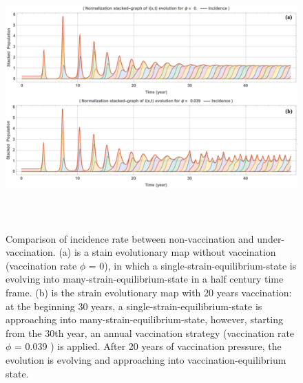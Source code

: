 \documentclass[preprint,12pt]{elsarticle}
\begin{document}
\begin{figure}
  \centering
  \includegraphics[width=6in,height=4in]{figures/UnderVaccination}
  \caption{Comparison of incidence rate between non-vaccination and under-vaccination.
  (a) is a stain evolutionary map without vaccination (vaccination rate \(\phi\) = 0), in which a single-strain-equilibrium-state is evolving into many-strain-equilibrium-state in a half century time frame. 
  (b) is the strain evolutionary map with 20 years vaccination: at the beginning 30 years, a single-strain-equilibrium-state is approaching into many-strain-equilibrium-state, however, starting from the 30th year, an annual vaccination strategy (vaccination rate \(\phi\) = 0.039 ) is applied. 
  After 20 years of vaccination pressure, the evolution is evolving and approaching into vaccination-equilibrium state.}
\label{fig:UnderVaccination}
\end{figure}
\end{document}

